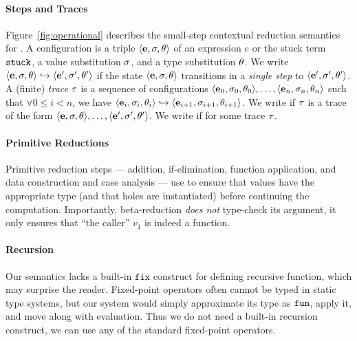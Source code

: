 \paragraph{Steps and Traces}

%
Figure~\ref{fig:operational} describes the small-step contextual
reduction semantics for \lang.
%
A configuration is a triple $\langle \mathbf{e}, \sigma, \theta \rangle$ of an
expression $e$ or the stuck term $\mathtt{stuck}$, a value substitution $\sigma$,
and a type substitution $\theta$.
%
%
We write $\langle \mathbf{e}, \sigma, \theta \rangle \hookrightarrow \langle \mathbf{e}', \sigma', \theta' \rangle$ if the state
$\langle \mathbf{e}, \sigma, \theta \rangle$ transitions in a \emph{single step} to
$\langle \mathbf{e}', \sigma', \theta' \rangle$.
%
A (finite) \emph{trace} $\tau$ is a sequence of configurations
$\langle \mathbf{e}_0, \sigma_0, \theta_0 \rangle, \ldots, \langle \mathbf{e}_n, \sigma_n, \theta_n \rangle$ such that
$\forall 0 \leq i < n$, we have
$\langle \mathbf{e}_i, \sigma_i, \theta_i \rangle \hookrightarrow \langle \mathbf{e}_{i+1}, \sigma_{i+1}, \theta_{i+1} \rangle$.
%
We write  if $\tau$ is
a trace of the form $\langle \mathbf{e}, \sigma, \theta \rangle,\ldots,\langle \mathbf{e}', \sigma', \theta' \rangle$.
%
We write  if
 for some trace $\tau$.

\paragraph{Primitive Reductions}
%
%
Primitive reduction steps --- addition, if-elimination,
function application, and data construction and case
analysis --- use \forcesym to ensure that values have
the appropriate type (and that holes are instantiated)
before continuing the computation.
%
Importantly, beta-reduction \emph{does not} type-check its
argument, it only ensures that ``the caller'' $v_1$ is indeed
a function.

\paragraph{Recursion}
%
Our semantics lacks a built-in $\mathtt{fix}$ construct
for defining recursive function, which may surprise
the reader.
%
Fixed-point operators often cannot be typed in static type
systems, but our system would simply approximate its type
as $\mathtt{fun}$, apply it, and move along with evaluation.
%
Thus we do not need a built-in recursion construct, we
can use any of the standard fixed-point operators.

